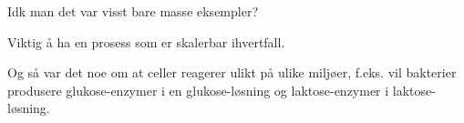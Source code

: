 Idk man det var visst bare masse eksempler?

Viktig å ha en prosess som er skalerbar ihvertfall. 

Og så var det noe om at celler reagerer ulikt på ulike miljøer, f.eks. vil bakterier produsere glukose-enzymer i en glukose-løsning
og laktose-enzymer i laktose-løsning.
